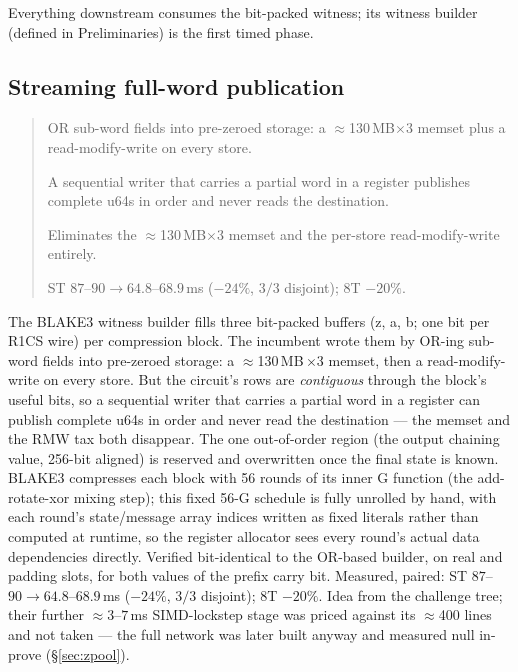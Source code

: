 \documentclass[11pt]{article}
\newenvironment{optsummary}{%
  \begin{quote}\small
  \begin{description}
  \setlength{\itemsep}{1pt}\setlength{\parsep}{0pt}\setlength{\topsep}{2pt}
}{%
  \end{description}
  \end{quote}
}
\begin{document}
Everything downstream consumes the bit-packed witness; its witness builder
(defined in Preliminaries) is the first timed phase.

\subsection{Streaming full-word publication}
\label{sec:streamwit}

\begin{optsummary}
\item[Baseline:] OR sub-word fields into pre-zeroed storage: a $\approx$130\,MB$\times$3 memset plus a read-modify-write on every store.
\item[Improvement:] A sequential writer that carries a partial word in a register publishes complete u64s in order and never reads the destination.
\item[Mechanism:] Eliminates the $\approx$130\,MB$\times$3 memset and the per-store read-modify-write entirely.
\item[Result:] ST $87$--$90\to64.8$--$68.9\,$ms ($-24\%$, $3/3$ disjoint); 8T $-20\%$.
\end{optsummary}

The BLAKE3 witness builder fills three bit-packed buffers (z, a, b; one bit
per R1CS wire) per compression block. The incumbent wrote them by OR-ing
sub-word fields into pre-zeroed storage: a $\approx$130\,MB\,$\times$3 memset,
then a read-modify-write on every store. But the circuit's rows are
\emph{contiguous} through the block's useful bits, so a sequential writer
that carries a partial word in a register can publish complete u64s in
order and never read the destination --- the memset and the RMW tax both
disappear. The one out-of-order region (the output chaining value, 256-bit
aligned) is reserved and overwritten once the final state is known. BLAKE3
compresses each block with 56 rounds of its inner G function (the
add-rotate-xor mixing step); this fixed 56-G schedule is fully unrolled
by hand, with each round's state/message array indices written as fixed
literals rather than computed at runtime, so the register allocator sees
every round's actual data dependencies directly. Verified bit-identical
to the OR-based builder, on real and padding slots, for both values of
the prefix carry bit.
Measured, paired: ST $87$--$90 \to 64.8$--$68.9\,$ms ($-24\%$, $3/3$
disjoint); 8T $-20\%$. Idea from the challenge tree; their further
$\approx$$3$--$7\,$ms SIMD-lockstep stage was priced against its
$\approx$400 lines and not taken --- the full network was later built
anyway and measured null in-prove (\S\ref{sec:zpool}).
\end{document}
